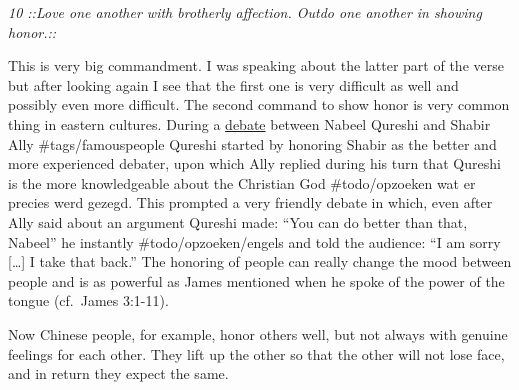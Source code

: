 \emph{10 ::Love one another with brotherly affection. Outdo one another
in showing honor.::}

This is very big commandment. I was speaking about the latter part of
the verse but after looking again I see that the first one is very
difficult as well and possibly even more difficult. The second command
to show honor is very common thing in eastern cultures. During a
\href{https://www.rzim.org/read/rzim-global/nabeel-qureshi-debates-muslim-apologist-shabir-ally}{debate}
between Nabeel Qureshi and Shabir Ally \#tags/famouspeople Qureshi
started by honoring Shabir as the better and more experienced debater,
upon which Ally replied during his turn that Qureshi is the more
knowledgeable about the Christian God \#todo/opzoeken wat er precies
werd gezegd. This prompted a very friendly debate in which, even after
Ally said about an argument Qureshi made: ``You can do better than that,
Nabeel'' he instantly \#todo/opzoeken/engels and told the audience: ``I
am sorry {[}\ldots{]} I take that back.'' The honoring of people can
really change the mood between people and is as powerful as James
mentioned when he spoke of the power of the tongue (cf.~James 3:1-11).

Now Chinese people, for example, honor others well, but not always with
genuine feelings for each other. They lift up the other so that the
other will not lose face, and in return they expect the same.

